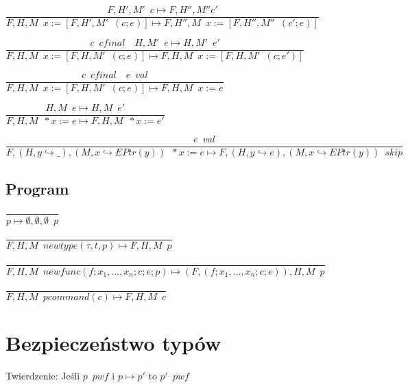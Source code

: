 \documentclass{article}
\begin{document}
\centerline{$\dfrac{F, H', M' \enspace c \longmapsto F, H'', M'' c' }{F, H, M \enspace x:= [F, H', M' \enspace (c;e)] \longmapsto F, H'', M \enspace x:= [F, H'', M'' \enspace (c';e)]}$}  \vspace{5pt}

\centerline{$\dfrac{c \enspace cfinal \quad H, M' \enspace e \longmapsto H, M' \enspace e' }{F, H, M \enspace x:= [F, H, M' \enspace (c;e)] \longmapsto F, H, M \enspace x:= [F, H, M' \enspace (c;e')]}$}  \vspace{5pt}

\centerline{$\dfrac{c \enspace cfinal \quad e \enspace val }{F, H, M \enspace x:= [F, H, M' \enspace (c;e)] \longmapsto F, H, M \enspace x:= e}$}  \vspace{5pt}

\centerline{$\dfrac{H, M \enspace e \longmapsto H, M \enspace e'}{F, H, M \enspace *x:=e \longmapsto F, H, M \enspace *x:=e'}$}\vspace{5pt}

\centerline{$\dfrac{e \enspace val}{F, (H, y \hookrightarrow \_), (M, x\hookrightarrow EPtr(y)) \enspace *x:=e \longmapsto F, (H, y \hookrightarrow e), (M, x \hookrightarrow EPtr(y)) \enspace skip}$}\vspace{5pt}

\subsection{Program}

\centerline{$\dfrac{}{p \longmapsto \emptyset, \emptyset, \emptyset \enspace p}$}\vspace{5pt}

\centerline{$\dfrac{}{F, H, M \enspace newtype(\tau, t, p) \longmapsto F, H, M \enspace p}$}\vspace{5pt}

\centerline{$\dfrac{}{F, H, M \enspace newfunc(f; x_1, ..., x_n; c; e; p) \longmapsto (F, (f; x_1,...,x_n;c;e)), H, M \enspace p}$}\vspace{5pt}

\centerline{$\dfrac{}{F, H, M \enspace pcommand(c) \longmapsto F, H, M \enspace c}$}\vspace{5pt}

\section{Bezpieczeństwo typów}

\Large{Twierdzenie: Jeśli $p \enspace pwf$ i $p \mapsto p'$ to $p' \enspace pwf$}
\end{document}
